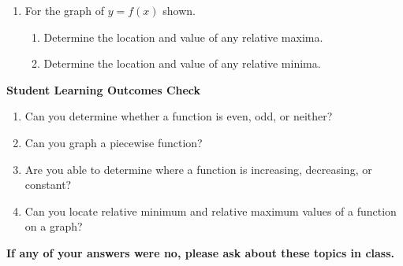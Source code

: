 \documentclass[11pt]{article}
\begin{document}
\begin{enumerate}
\item For the graph of $y=f(x)$ shown.\\
\begin{enumerate}
\item Determine the location and value of any relative maxima.\\[.3in]
\item Determine the location and value of any relative minima.
\end{enumerate}

\vfill
\end{enumerate}

\noindent \textbf{Student Learning Outcomes Check}

\begin{enumerate}
\item Can you determine whether a function is even, odd, or neither?
\item Can you graph a piecewise function?
\item Are you able to determine where a function is increasing, decreasing, or constant?
\item  Can you locate relative minimum and relative maximum values of a function on a graph?

\end{enumerate}

\noindent \textbf{If any of your answers were no, please ask about these topics in class.}
\end{document}
